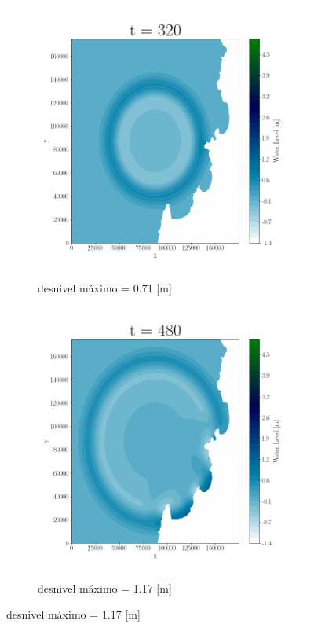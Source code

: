 \begin{figure}[H]
\begin{subfigure}[b]{.4\linewidth}
\includegraphics[width=\linewidth]{Figures/Plots/Serena3.png}
\caption{desnivel máximo = 0.71 [m]}
\end{subfigure}
\begin{subfigure}[b]{.4\linewidth}
\includegraphics[width=\linewidth]{Figures/Plots/Serena4.png}
\caption{desnivel máximo = 1.17 [m]}
\end{subfigure}


\end{figure}
